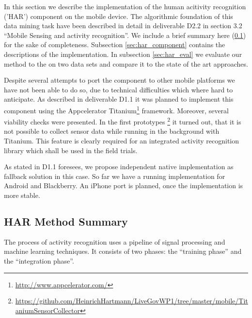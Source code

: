 \label{sec:HAR}

In this section we describe the implementation of the human acitivity
recognition ('HAR') component on the mobile device.  The algorithmic
foundation of this data mining task have been described in detail in
deliverable D2.2 in section 3.2 ``Mobile Sensing and activity
recognition''. We include a brief summary here (\ref{sec:har_method})
for the sake of completeness. Subsection \ref{sec:har_component}
contains the descriptions of the implementation. In subsection
\ref{sec:har_eval} we evaluate our method to the on two data sets and
compare it to the state of the art approaches.

Despite several attempts to port the component to other mobile
platforms we have not been able to do so, due to technical
difficulties which where hard to anticipate. As described in
deliverable D1.1 it was planned to implement this component using the
Appcelerator Titanium\footnote{\url{http://www.appcelerator.com/}}
framework. Moreover, several viability checks were presented. In the
first prototypes
\footnote{\url{https://github.com/HeinrichHartmann/LiveGovWP1/tree/master/mobile/TitaniumSensorCollector}}
it turned out, that it is not possible to collect sensor data while
running in the background with Titanium. This feature is clearly
required for an integrated activity recognition library which shall be
used in the field trials.

As stated in D1.1 foresees, we propose independent native
implementation as fallback solution in this case. So far we have a
running implementation for Android and Blackberry. An iPhone port is
planned, once the implementation is more stable.


\subsection{HAR Method Summary}\label{sec:har_method}

The process of activity recognition uses a pipeline of signal
processing and machine learning techniques. It consists of two phases:
the ``training phase'' and the ``integration phase''. 

